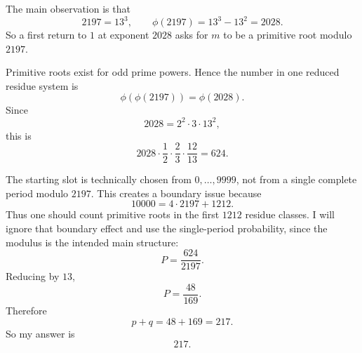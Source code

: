 The main observation is that
\[
2197=13^3,\qquad \phi(2197)=13^3-13^2=2028.
\]
So a first return to \(1\) at exponent \(2028\) asks for \(m\) to be a primitive root modulo \(2197\).

Primitive roots exist for odd prime powers.  Hence the number in one reduced residue system is
\[
\phi(\phi(2197))=\phi(2028).
\]
Since
\[
2028=2^2\cdot3\cdot13^2,
\]
this is
\[
2028\cdot\frac12\cdot\frac23\cdot\frac{12}{13}=624.
\]

The starting slot is technically chosen from \(0,\ldots,9999\), not from a single complete period modulo \(2197\).  This creates a boundary issue because
\[
10000=4\cdot2197+1212.
\]
Thus one should count primitive roots in the first \(1212\) residue classes.  I will ignore that boundary effect and use the single-period probability, since the modulus is the intended main structure:
\[
P=\frac{624}{2197}.
\]
Reducing by \(13\),
\[
P=\frac{48}{169}.
\]
Therefore
\[
p+q=48+169=217.
\]
So my answer is
\[
\boxed{217}.
\]
